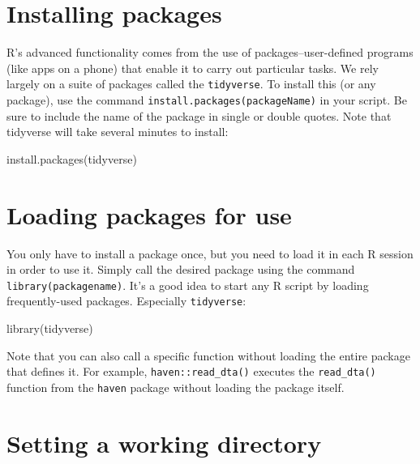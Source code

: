 \documentclass[
  12pt,
]{krantz}
\newenvironment{Shaded}{\begin{snugshade}}{\end{snugshade}}
\newcommand{\FunctionTok}[1]{\textcolor[rgb]{0.00,0.00,0.00}{#1}}
\newcommand{\NormalTok}[1]{#1}
\newcommand{\StringTok}[1]{\textcolor[rgb]{0.31,0.60,0.02}{#1}}
\begin{document}
\hypertarget{installing-packages}{%
\section{Installing packages}\label{installing-packages}}

R's advanced functionality comes from the use of packages--user-defined programs (like apps on a phone) that enable it to carry out particular tasks. We rely largely on a suite of packages called the \texttt{tidyverse}. To install this (or any package), use the command \texttt{install.packages(\textquotesingle{}packageName\textquotesingle{})} in your script. Be sure to include the name of the package in single or double quotes. Note that tidyverse will take several minutes to install:

\begin{Shaded}
\begin{Highlighting}[]
  \FunctionTok{install.packages}\NormalTok{(}\StringTok{\textquotesingle{}tidyverse\textquotesingle{}}\NormalTok{)}
\end{Highlighting}
\end{Shaded}

\hypertarget{loading-packages-for-use}{%
\section{Loading packages for use}\label{loading-packages-for-use}}

You only have to install a package once, but you need to load it in each R session in order to use it. Simply call the desired package using the command \texttt{library(packagename)}. It's a good idea to start any R script by loading frequently-used packages. Especially \texttt{tidyverse}:

\begin{Shaded}
\begin{Highlighting}[]
  \FunctionTok{library}\NormalTok{(tidyverse)}
\end{Highlighting}
\end{Shaded}

Note that you can also call a specific function without loading the entire package that defines it. For example, \texttt{haven::read\_dta()} executes the \texttt{read\_dta()} function from the \texttt{haven} package without loading the package itself.

\hypertarget{setting-a-working-directory}{%
\section{Setting a working directory}\label{setting-a-working-directory}}
\end{document}
